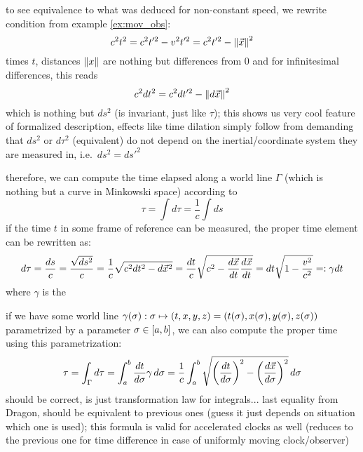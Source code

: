 to see equivalence to what was deduced for non-constant speed, we rewrite condition from example \ref{ex:mov_obs}:
\begin{equation*}
c^2 t^2 = c^2 t'^2 - v^2 t'^2 = c^2 t'^2 - \norm{\vec{x}}^2
\end{equation*}
times $t$, distances $\norm{x}$ are nothing but differences from $0$ and for infinitesimal differences, this reads
\begin{equation*}
c^2 dt^2 = c^2 dt'^2 - \norm{d\vec{x}}^2
\end{equation*}
which is nothing but $ds^2$ (is invariant, just like $\tau$); this shows us very cool feature of formalized description, effects like time dilation simply follow from demanding that $ds^2$ or $d\tau^2$ (equivalent) do not depend on the inertial/coordinate system they are measured in, i.e.~$ds^2 = ds'^2$



therefore, we can compute the time elapsed along a world line $\Gamma$ (which is nothing but a curve in Minkowski space) according to
\begin{equation}
\tau = \int d\tau = \frac{1}{c} \int ds
\end{equation}
if the time $t$ in some frame of reference can be measured, the proper time element can be rewritten as:
\begin{equation}
d\tau = \frac{ds}{c} = \frac{\sqrt{ds^2}}{c} = \frac{1}{c} \sqrt{c^2 dt^2 - d\vec{x}^2} = \frac{dt}{c} \sqrt{c^2 - \dv{\vec{x}}{t} \dv{\vec{x}}{t}} = dt \sqrt{1 - \frac{v^2}{c^2}} =: \gamma dt
\end{equation}
where $\gamma$ is the 


if we have some world line $\gamma(\sigma): \sigma \mapsto \qty(t, x, y, z) = \qty(t(\sigma), x(\sigma), y(\sigma), z(\sigma))$ parametrized by a parameter $\sigma \in \qty[a, b]$, we can also compute the proper time using this parametrization:
\begin{equation}
\tau = \int_\Gamma d\tau = \int_a^b \dv{t}{\sigma} \gamma \, d\sigma = \frac{1}{c} \int_a^b \sqrt{\qty(\dv{t}{\sigma})^2 - \qty(\dv{\vec{x}}{\sigma})^2} \, d\sigma
\end{equation}
should be correct, is just transformation law for integrals... last equality from Dragon, should be equivalent to previous ones (guess it just depends on situation which one is used); this formula is valid for accelerated clocks as well (reduces to the previous one for time difference in case of uniformly moving clock/observer)




